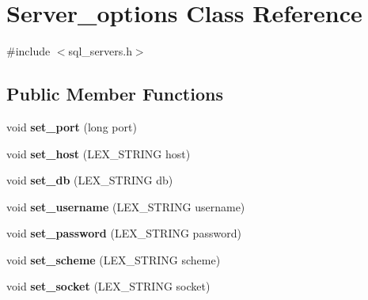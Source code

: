 \hypertarget{classServer__options}{}\section{Server\+\_\+options Class Reference}
\label{classServer__options}


{\ttfamily \#include $<$sql\+\_\+servers.\+h$>$}

\subsection*{Public Member Functions}
\begin{DoxyCompactItemize}
\item 
\mbox{\label{classServer__options_a7889cc736aff15d17b3a01d540ed7a93}} 
void {\bfseries set\+\_\+port} (long port)
\item 
\mbox{\label{classServer__options_a557b68d4782db50cb36b3bfb15f751fc}} 
void {\bfseries set\+\_\+host} (L\+E\+X\+\_\+\+S\+T\+R\+I\+NG host)
\item 
\mbox{\label{classServer__options_a8a8cc87226241c3f907c9fa4916394f8}} 
void {\bfseries set\+\_\+db} (L\+E\+X\+\_\+\+S\+T\+R\+I\+NG db)
\item 
\mbox{\label{classServer__options_aa4145b902f4791d559d8900071dd72b9}} 
void {\bfseries set\+\_\+username} (L\+E\+X\+\_\+\+S\+T\+R\+I\+NG username)
\item 
\mbox{\label{classServer__options_adc3d93c7ed61612bc51507417f06bdb9}} 
void {\bfseries set\+\_\+password} (L\+E\+X\+\_\+\+S\+T\+R\+I\+NG password)
\item 
\mbox{\label{classServer__options_a0f51ac90d414758af6e33fb6f40fb444}} 
void {\bfseries set\+\_\+scheme} (L\+E\+X\+\_\+\+S\+T\+R\+I\+NG scheme)
\item 
\mbox{\label{classServer__options_a727ee7dbe6bb6f5c240cb403d2a50b75}} 
void {\bfseries set\+\_\+socket} (L\+E\+X\+\_\+\+S\+T\+R\+I\+NG socket)
\item 
\mbox{\label{classServer__options_aa7f0b49c885efef63f59214428698ae7}} 

\end{DoxyCompactItemize}
